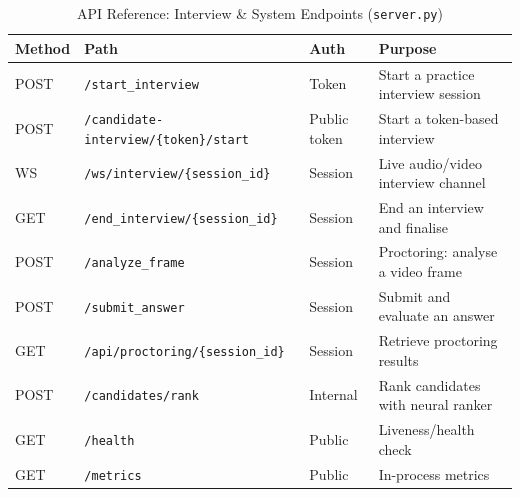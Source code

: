 \documentclass[12pt,a4paper,oneside]{report}
\begin{document}
\begin{table}[H]
\centering
\caption{API Reference: Interview \& System Endpoints (\texttt{server.py})}
\label{tab:api1}
\begin{tabularx}{\textwidth}{C{1.4cm}L{5.5cm}C{1.8cm}X}
\toprule
\textbf{Method} & \textbf{Path} & \textbf{Auth} & \textbf{Purpose} \\
\midrule
POST & \texttt{/start\_interview} & Token & Start a practice interview session \\
POST & \texttt{/candidate-interview/\{token\}/start} & Public token & Start a token-based interview \\
WS   & \texttt{/ws/interview/\{session\_id\}} & Session & Live audio/video interview channel \\
GET  & \texttt{/end\_interview/\{session\_id\}} & Session & End an interview and finalise \\
POST & \texttt{/analyze\_frame} & Session & Proctoring: analyse a video frame \\
POST & \texttt{/submit\_answer} & Session & Submit and evaluate an answer \\
GET  & \texttt{/api/proctoring/\{session\_id\}} & Session & Retrieve proctoring results \\
POST & \texttt{/candidates/rank} & Internal & Rank candidates with neural ranker \\
GET  & \texttt{/health} & Public & Liveness/health check \\
GET  & \texttt{/metrics} & Public & In-process metrics \\
\bottomrule
\end{tabularx}
\end{table}
\end{document}
